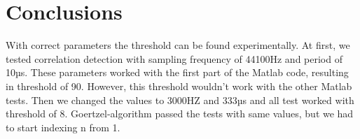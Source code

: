\section{Conclusions}
With correct parameters the threshold can be found experimentally. At first, we tested correlation detection with sampling frequency of 44100Hz and period of 10µs. These parameters worked  with the first part of the Matlab code, resulting in threshold of 90. However, this threshold wouldn't work with the other Matlab tests. Then we changed the values to 3000HZ and 333µs and all test worked with threshold of 8. Goertzel-algorithm passed the tests with same values, but we had to start indexing n from 1.